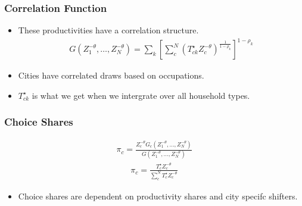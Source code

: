 \documentclass[serif, 9pt, aspectratio=32]{beamer}
\begin{document}
\begin{frame}
    \centering
    \frametitle{Correlation Function}
    \begin{itemize}
        \setlength{\itemsep}{2em}
        \item These productivities have a correlation structure.
              \begin{equation}
                  \label{correlation}
                  \begin{aligned}
                      G (Z_1^{-\theta}, \dots, Z_N^{-\theta})= \sum_{k}^{} [\sum_{c}^{N} (T_{ck}^{\star} Z_c^{-\theta})^{\frac{1}{1 - \rho_k}}]^{1 - \rho_k}
                  \end{aligned}
              \end{equation}
    \end{itemize}
    \vspace{2em}
    \begin{itemize}
        \item Cities have correlated draws based on occupations.
        \item $T_{ck}^{\star}$ is what we get when we intergrate over all household types.
    \end{itemize}
\end{frame}

\begin{frame}
    \centering
    \frametitle{Choice Shares}
    \begin{equation}
        \label{choice_shares}
        \begin{aligned}
            \pi_c = \frac{Z_c^{-\theta} G_c(Z_1^{-\theta}, \dots, Z_N^{-\theta})}{G(Z_1^{-\theta}, \dots, Z_N^{-\theta})}
        \end{aligned}
    \end{equation}
    \vspace{2em}
    \begin{equation}
        \label{choice_shares_complete}
        \begin{aligned}
            \pi_c = \frac{T_c^{\star} Z_c^{-\theta}}{\sum_{c}^{N} T_c^{\star} Z_c^{-\theta}}
        \end{aligned}
    \end{equation}
    \vspace{2em}
    \begin{itemize}
        \setlength{\itemsep}{2em}
        \item Choice shares are dependent on productivity shares and city specifc shifters.
    \end{itemize}
\end{frame}
\end{document}
